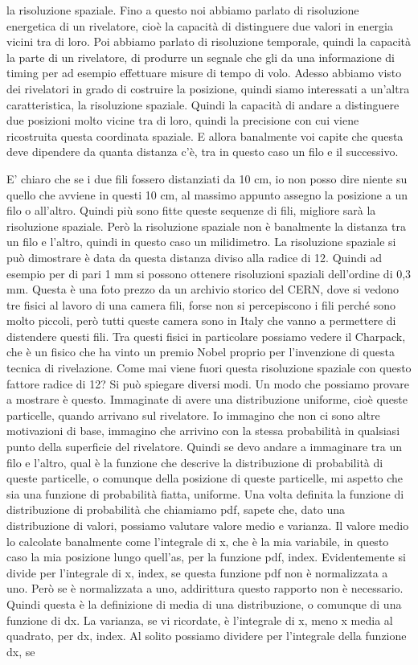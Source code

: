 la risoluzione spaziale. Fino a questo noi abbiamo parlato di risoluzione energetica di un rivelatore, cioè la capacità di distinguere due valori in energia vicini tra di loro. Poi abbiamo parlato di risoluzione temporale, quindi la capacità la parte di un rivelatore, di produrre un segnale che gli da una informazione di timing per ad esempio effettuare misure di tempo di volo. Adesso abbiamo visto dei rivelatori in grado di costruire la posizione, quindi siamo interessati a un'altra caratteristica, la risoluzione spaziale. Quindi la capacità di andare a distinguere due posizioni molto vicine tra di loro, quindi la precisione con cui viene ricostruita questa coordinata spaziale. E allora banalmente voi capite che questa deve dipendere da quanta distanza c'è, tra in questo caso un filo e il successivo. 

E' chiaro che se i due fili fossero distanziati da 10 cm, io non posso dire niente su quello che avviene in questi 10 cm, al massimo appunto assegno la posizione a un filo o all'altro. Quindi più sono fitte queste sequenze di fili, migliore sarà la risoluzione spaziale. Però la risoluzione spaziale non è banalmente la distanza tra un filo e l'altro, quindi in questo caso un milidimetro. La risoluzione spaziale si può dimostrare è data da questa distanza diviso alla radice di 12. Quindi ad esempio per di pari 1 mm si possono ottenere risoluzioni spaziali dell'ordine di 0,3 mm. Questa è una foto prezzo da un archivio storico del CERN, dove si vedono tre fisici al lavoro di una camera fili, forse non si percepiscono i fili perché sono molto piccoli, però tutti queste camera sono in Italy che vanno a permettere di distendere questi fili. Tra questi fisici in particolare possiamo vedere il Charpack, che è un fisico che ha vinto un premio Nobel proprio per l'invenzione di questa tecnica di rivelazione. Come mai viene fuori questa risoluzione spaziale con questo fattore radice di 12? Si può spiegare diversi modi. Un modo che possiamo provare a mostrare è questo. Immaginate di avere una distribuzione uniforme, cioè queste particelle, quando arrivano sul rivelatore. Io immagino che non ci sono altre motivazioni di base, immagino che arrivino con la stessa probabilità in qualsiasi punto della superficie del rivelatore. Quindi se devo andare a immaginare tra un filo e l'altro, qual è la funzione che descrive la distribuzione di probabilità di queste particelle, o comunque della posizione di queste particelle, mi aspetto che sia una funzione di probabilità fiatta, uniforme. Una volta definita la funzione di distribuzione di probabilità che chiamiamo pdf, sapete che, dato una distribuzione di valori, possiamo valutare valore medio e varianza. Il valore medio lo calcolate banalmente come l'integrale di x, che è la mia variabile, in questo caso la mia posizione lungo quell'as, per la funzione pdf, index. Evidentemente si divide per l'integrale di x, index, se questa funzione pdf non è normalizzata a uno. Però se è normalizzata a uno, addirittura questo rapporto non è necessario. Quindi questa è la definizione di media di una distribuzione, o comunque di una funzione di dx. La varianza, se vi ricordate, è l'integrale di x, meno x media al quadrato, per dx, index. Al solito possiamo dividere per l'integrale della funzione dx, se 